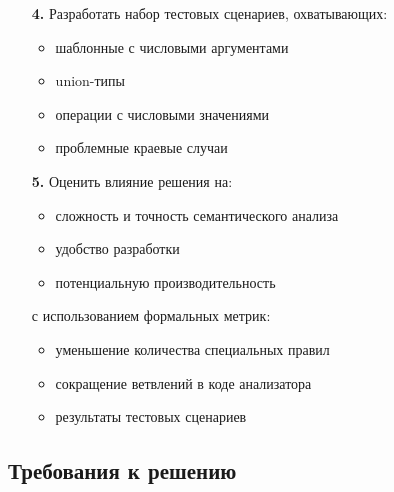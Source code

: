\begin{enumerate}[leftmargin=*,align=left]
    \item[\textbf{4.}] Разработать набор тестовых сценариев, охватывающих:
    \begin{itemize}[label={--}]
        \item шаблонные с числовыми аргументами
        \item union-типы
        \item операции с числовыми значениями
        \item проблемные краевые случаи
    \end{itemize}

    \item[\textbf{5.}] Оценить влияние решения на:
    \begin{itemize}[label={--}]
        \item сложность и точность семантического анализа
        \item удобство разработки
        \item потенциальную производительность
    \end{itemize}
    с использованием формальных метрик:
    \begin{itemize}[label={--}]
        \item уменьшение количества специальных правил
        \item сокращение ветвлений в коде анализатора
        \item результаты тестовых сценариев
    \end{itemize}
\end{enumerate}

\subsection{Требования к решению}
